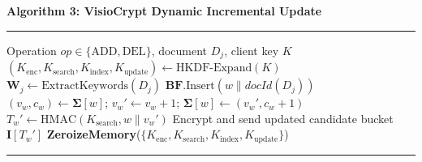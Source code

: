 \documentclass[preview,varwidth=88mm]{standalone}
\begin{document}
\noindent\textbf{Algorithm 3: VisioCrypt Dynamic Incremental Update}
\vspace{1mm}\hrule\vspace{1mm}
\begin{algorithmic}[1]
\Require Operation $op \in \{\text{ADD}, \text{DEL}\}$, document $D_j$, client key $K$
\State $(K_{\text{enc}}, K_{\text{search}}, K_{\text{index}}, K_{\text{update}}) \leftarrow \text{HKDF-Expand}(K)$
\State $\mathbf{W}_j \leftarrow \text{ExtractKeywords}(D_j)$
        \State $\mathbf{BF}\text{.Insert}(w \parallel docId(D_j))$ 
    \Else
        \State $(v_w, c_w) \leftarrow \mathbf{\Sigma}[w]$; $v_w' \leftarrow v_w + 1$; $\mathbf{\Sigma}[w] \leftarrow (v_w', c_w + 1)$
        \State $T_w' \leftarrow \text{HMAC}(K_{\text{search}}, w \parallel v_w')$
        \State Encrypt and send updated candidate bucket $\mathbf{I}[T_w']$
    \EndIf
\EndFor
\State \textbf{ZeroizeMemory}($\{K_{\text{enc}}, K_{\text{search}}, K_{\text{index}}, K_{\text{update}}\}$)
\end{algorithmic}
\vspace{1mm}\hrule
\end{document}
